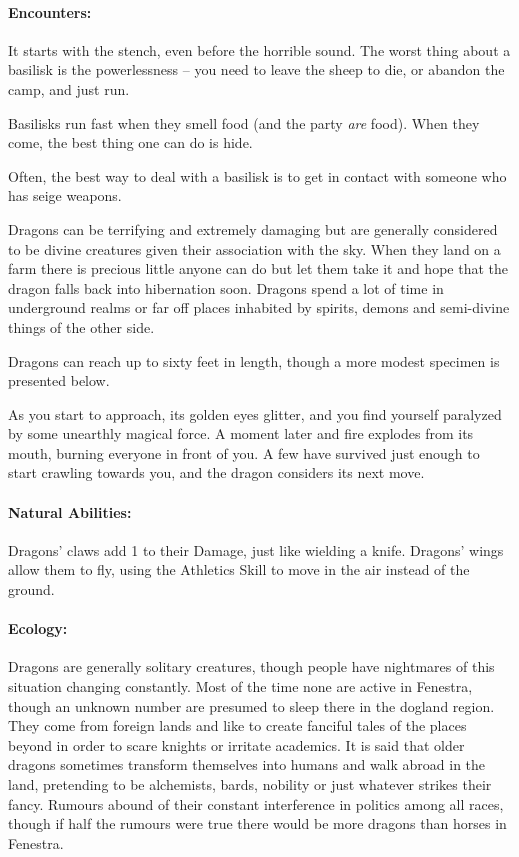 	\paragraph{Encounters:} It starts with the stench, even before the horrible sound.  The worst thing about a basilisk is the powerlessness -- you need to leave the sheep to die, or abandon the camp, and just run.

	Basilisks run fast when they smell food (and the party \emph{are} food).  When they come, the best thing one can do is hide.

	Often, the best way to deal with a basilisk is to get in contact with someone who has seige weapons.

\label{dragon}

\dragon

Dragons can be terrifying and extremely damaging but are generally considered to be divine creatures given their association with the sky.  When they land on a farm there is precious little anyone can do but let them take it and hope that the dragon falls back into hibernation soon.  Dragons spend a lot of time in underground realms or far off places inhabited by spirits, demons and semi-divine things of the other side.

	Dragons can reach up to sixty feet in length, though a more modest specimen is presented below.

\begin{boxtext}

	As you start to approach, its golden eyes glitter, and you find yourself paralyzed by some unearthly magical force.  A moment later and fire explodes from its mouth, burning everyone in front of you.  A few have survived just enough to start crawling towards you, and the dragon considers its next move.

\end{boxtext}

	\paragraph{Natural Abilities:} Dragons' claws add 1 to their Damage, just like wielding a knife.  Dragons' wings allow them to fly, using the Athletics Skill to move in the air instead of the ground.

	\paragraph{Ecology:} Dragons are generally solitary creatures, though people have nightmares of this situation changing constantly.  Most of the time none are active in Fenestra, though an unknown number are presumed to sleep there in the dogland region.  They come from foreign lands and like to create fanciful tales of the places beyond in order to scare knights or irritate academics.  It is said that older dragons sometimes transform themselves into humans and walk abroad in the land, pretending to be alchemists, bards, nobility or just whatever strikes their fancy.  Rumours abound of their constant interference in politics among all races, though if half the rumours were true there would be more dragons than horses in Fenestra.

